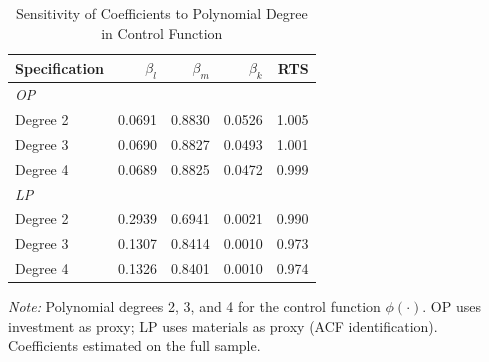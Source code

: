 \documentclass[a4paper, 12pt]{article}
\begin{document}
\begin{table}[htbp]
\centering
\caption{Sensitivity of Coefficients to Polynomial Degree in Control Function}
\label{tab:poly_sensitivity}
\begin{tabular}{lrrrr}
\toprule
Specification & $\beta_l$ & $\beta_m$ & $\beta_k$ & RTS \\
\midrule
\multicolumn{5}{l}{\textit{OP}} \\
  \quad Degree 2 & 0.0691 & 0.8830 & 0.0526 & 1.005 \\
  \quad Degree 3 & 0.0690 & 0.8827 & 0.0493 & 1.001 \\
  \quad Degree 4 & 0.0689 & 0.8825 & 0.0472 & 0.999 \\
\midrule
\multicolumn{5}{l}{\textit{LP}} \\
  \quad Degree 2 & 0.2939 & 0.6941 & 0.0021 & 0.990 \\
  \quad Degree 3 & 0.1307 & 0.8414 & 0.0010 & 0.973 \\
  \quad Degree 4 & 0.1326 & 0.8401 & 0.0010 & 0.974 \\
\bottomrule
\end{tabular}
\begin{flushleft}
\footnotesize
\textit{Note:} Polynomial degrees 2, 3, and 4 for the control function $\phi(\cdot)$.
OP uses investment as proxy; LP uses materials as proxy (ACF identification).
Coefficients estimated on the full sample.
\end{flushleft}
\end{table}
\end{document}
